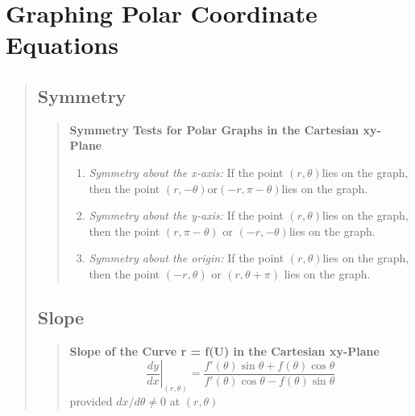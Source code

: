 \documentclass{report}
\begin{document}
\section{Graphing Polar Coordinate Equations }
\begin{quote}

	\subsection{Symmetry}
	\begin{quote}
		\textbf{Symmetry Tests for Polar Graphs in the Cartesian xy-Plane}\\
		\begin{enumerate}
			\item \textit{Symmetry about the x-axis:} If the point $(r,\theta)$lies on the graph, then the point $(r,-\theta)$or$(-r,\pi-\theta)$lies on the graph.
			\item \textit{Symmetry about the y-axis:} If the point $(r,\theta)$lies on the graph, then the point $(r,\pi -\theta)$ or $(-r,-\theta)$lies on the graph.
			\item \textit{Symmetry about the origin:} If the point $(r,\theta)$lies on the graph, then the point $(-r,\theta)$ or $(r, \theta +\pi)$ lies on the graph.
		\end{enumerate}
	\end{quote}

	\subsection{Slope}
	\begin{quote}

		\textbf{Slope of the Curve r = ƒ(U) in the Cartesian xy-Plane}
		$$\left. \frac{dy}{dx} \right |_{(r,\theta)} = \frac{f'(\theta)\sin \theta + f(\theta)\cos \theta}{f'(\theta)\cos \theta - f(\theta)\sin\theta}$$
		provided $dx/d\theta\neq 0$ at $(r,\theta)$

	\end{quote}

\end{quote}

\end{document}
